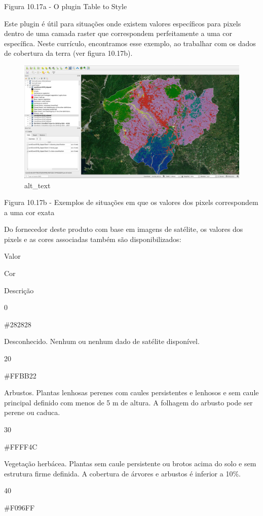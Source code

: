 \documentclass[
  portuguese,
]{krantz}
\begin{document}
Figura 10.17a - O plugin Table to Style

Este plugin é útil para situações onde existem valores específicos para pixels dentro de uma camada raster que correspondem perfeitamente a uma cor específica. Neste currículo, encontramos esse exemplo, ao trabalhar com os dados de cobertura da terra (ver figura 10.17b).

\begin{figure}
\centering
\includegraphics{media/modulo10/fig1017_b.png}
\caption{alt\_text}
\end{figure}

Figura 10.17b - Exemplos de situações em que os valores dos pixels correspondem a uma cor exata

Do fornecedor deste produto com base em imagens de satélite, os valores dos pixels e as cores associadas também são disponibilizados:

Valor

Cor

Descrição

0

\#282828

Desconhecido. Nenhum ou nenhum dado de satélite disponível.

20

\#FFBB22

Arbustos. Plantas lenhosas perenes com caules persistentes e lenhosos e sem caule principal definido com menos de 5 m de altura. A folhagem do arbusto pode ser perene ou caduca.

30

\#FFFF4C

Vegetação herbácea. Plantas sem caule persistente ou brotos acima do solo e sem estrutura firme definida. A cobertura de árvores e arbustos é inferior a 10\%.

40

\#F096FF
\end{document}
